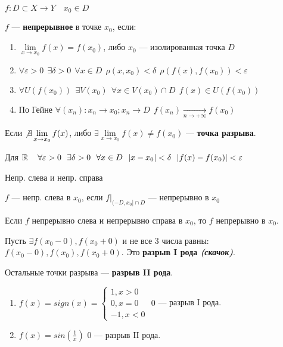 \begin{definition}
    $f:D\subset X\to Y \quad x_0\in D$

    $f$ --- \textbf{непрерывное} в точке $x_0$, если:
    \begin{enumerate}
        \item $\lim\limits_{x\to x_0} f(x)=f(x_0)$, либо $x_0$ --- изолированная точка $D$
        \item $\forall \varepsilon > 0 \ \ \exists \delta>0 \ \ \forall x\in D \ \ \rho(x, x_0)<\delta \ \ \rho(f(x), f(x_0))<\varepsilon$
        \item $\forall U(f(x_0)) \ \ \exists V(x_0) \ \ \forall x\in V(x_0)\cap D \ \ f(x)\in U(f(x_0))$
        \item По Гейне $\forall (x_n):x_n\to x_0; x_n\to D \ \ f(x_n)\xrightarrow[n\to+\infty]{} f(x_0)$
    \end{enumerate}
\end{definition}

\begin{definition}
    Если $\not\exists\lim\limits_{x\to x_0} f(x)$, либо $\exists\lim\limits_{x\to x_0}f(x)\not=f(x_0)$ --- \textbf{точка разрыва}.
\end{definition}

Для $\R \quad \forall \varepsilon>0 \ \ \exists \delta > 0 \ \ \forall x\in D \ \ |x-x_0|<\delta \ \ |f(x) - f(x_0)|<\varepsilon$

\begin{definition}
    Непр. слева и непр. справа

    $f$ --- непр. слева в $x_0$, если $f|_{(-D, x_0]\cap D}$ --- непрерывно в $x_0$
\end{definition}

Если $f$ непрерывно слева и непрерывно справа в $x_0$, то $f$ непрерывно в $x_0$.

\begin{definition}
    Пусть $\exists f(x_0-0), f(x_0+0)$ и не все 3 числа равны: $f(x_0-0), f(x_0), f(x_0+0)$. Это \textbf{разрыв I рода \textit{(скачок)}}.

    Остальные точки разрыва --- \textbf{разрыв II рода}.
\end{definition}

\begin{example}
    \begin{enumerate}
        \item $f(x)=sign(x)=\begin{cases}
            1, x>0 \\
            0, x=0 \\
            -1, x<0
        \end{cases}$ $0$ --- разрыв I рода.

        \item $f(x)=sin(\frac{1}{x})$ $0$ --- разрыв II рода.
    \end{enumerate}
\end{example}

